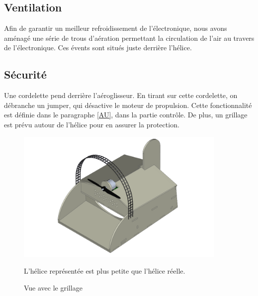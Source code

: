 			\subsection{Ventilation}
			Afin de garantir un meilleur refroidissement de l'électronique, nous avons aménagé une série de trous d'aération permettant la circulation de l'air au travers de l'électronique. Ces évents sont situés juste derrière l'hélice.
			\subsection{Sécurité} Une cordelette pend derrière l'aéroglisseur. En tirant sur cette cordelette, on débranche un jumper, qui désactive le moteur de propulsion. Cette fonctionnalité est définie dans le paragraphe \ref{AU}, dans la partie contrôle. De plus, un grillage est prévu autour de l'hélice pour en assurer la protection.
			\begin{figure}[h]
					\begin{center}
						\includegraphics[width=0.9\textwidth]{../Illus/AeroProt.png}
					
					\caption{Vue avec le grillage}
					\small L'hélice représentée est plus petite que l'hélice réelle.
					\end{center}
				\end{figure}
